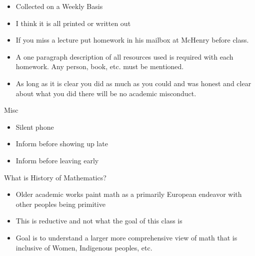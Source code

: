 \documentclass{report}
\begin{document}
\begin{description}
\begin{mdframed}
            \begin{itemize}
                \item Collected on a Weekly Basis
                \item I think it is all printed or written
                    out
                \item If you miss a lecture put homework in his
                    mailbox at McHenry before class.
                \item A one paragraph description of all resources
                    used is required with each homework. Any person,
                    book, etc. must be mentioned.
                \item As long as it is clear you did as much as you could
                    and was honest and clear about what you did there
                    will be no academic misconduct.
            \end{itemize}
        \end{mdframed}
        \begin{mdframed}
            {\large Misc}
            \begin{itemize}
                \item Silent phone
                \item Inform before showing up late
                \item Inform before leaving early
            \end{itemize}
        \end{mdframed}


    \item What is History of Mathematics?
        \begin{mdframed}
            \begin{itemize}
                \item Older academic works paint math as a
                    primarily European endeavor with other
                    peoples being primitive
                \item This is reductive and not what the
                    goal of this class is 
                \item Goal is to understand a larger more
                    comprehensive view of math that is inclusive
                    of Women, Indigenous peoples, etc.
            \end{itemize}
        \end{mdframed}
\end{description}
\end{document}
